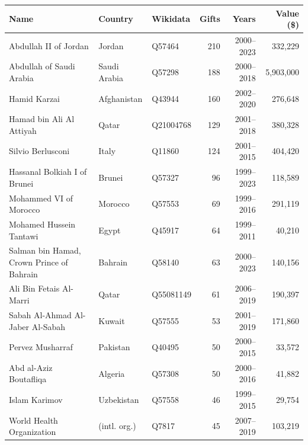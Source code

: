 \begin{tabular}{lllrrr}
\toprule
Name & Country & Wikidata & Gifts & Years & Value (\$) \\
\midrule
Abdullah II of Jordan & Jordan & Q57464 & 210 & 2000--2023 & 332,229 \\
Abdullah of Saudi Arabia & Saudi Arabia & Q57298 & 188 & 2000--2018 & 5,903,000 \\
Hamid Karzai & Afghanistan & Q43944 & 160 & 2002--2020 & 276,648 \\
Hamad bin Ali Al Attiyah & Qatar & Q21004768 & 129 & 2001--2018 & 380,328 \\
Silvio Berlusconi & Italy & Q11860 & 124 & 2001--2015 & 404,420 \\
Hassanal Bolkiah I of Brunei & Brunei & Q57327 & 96 & 1999--2023 & 118,589 \\
Mohammed VI of Morocco & Morocco & Q57553 & 69 & 1999--2016 & 291,119 \\
Mohamed Hussein Tantawi & Egypt & Q45917 & 64 & 1999--2011 & 40,210 \\
Salman bin Hamad, Crown Prince of Bahrain & Bahrain & Q58140 & 63 & 2000--2023 & 140,156 \\
Ali Bin Fetais Al-Marri & Qatar & Q55081149 & 61 & 2006--2019 & 190,397 \\
Sabah Al-Ahmad Al-Jaber Al-Sabah & Kuwait & Q57555 & 53 & 2001--2019 & 171,860 \\
Pervez Musharraf & Pakistan & Q40495 & 50 & 2000--2015 & 33,572 \\
Abd al-Aziz Boutafliqa & Algeria & Q57308 & 50 & 2000--2016 & 41,882 \\
Islam Karimov & Uzbekistan & Q57558 & 46 & 1999--2015 & 29,754 \\
World Health Organization & (intl. org.) & Q7817 & 45 & 2007--2019 & 103,219 \\
\bottomrule
\end{tabular}
